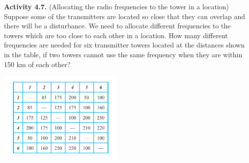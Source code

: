 \documentclass[aspectratio=169]{beamer}
\begin{document}
\begin{frame}[plain]{}
 
 
 {\bf Activity 4.7.} (Allocating the radio frequencies to the tower in a location)
  Suppose some of the transmitters are
  located so close  that they can overlap and there will be a disturbance.
 We need to allocate different frequencies to the
towers which are too close to each other in a location.
   How many different frequencies are needed for six transmitter towers
    located at the distances 
  shown in the table, if two towers cannot use the same frequency 
  when they are within 150 km of each other?
  
  \begin{center}
         \includegraphics[height=4.5cm]{./img/lecture4-fig8.png}
       \end{center}

\end{frame}



\end{document}
